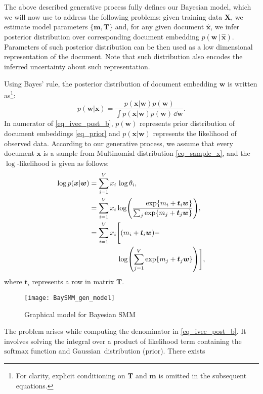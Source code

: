 \documentclass[journal]{IEEEtran}
\newcommand{\mb}[1]{\bm{#1}}
\newcommand{\Gau}{\(\mathrm{Gaussian}\)}
\newcommand{\myfrac}[2]{\setbox0\hbox{$#1$}        \dimen0=\wd0               \setbox1\hbox{$#2$}        \dimen1=\wd1               \ifdim\wd0<\wd1            \dfrac{\hfill#1}{#2}     \else
	\dfrac{#1}{\hfill#2}     \fi
}
\begin{document}
The above described generative process fully defines our Bayesian model,
which we will now use to address the following problems: given training data
\(\mb{X}\), we estimate model parameters \(\{\mb{m}, \mb{T}\}\) and,
for any given document \(\widehat{\mb{x}}\), we infer posterior distribution over
corresponding document embedding \(p(\mb{w}\,|\, \widehat{\mb{x}})\).
Parameters of such posterior distribution can be then used as a low dimensional
representation of the document. Note that such distribution also encodes the
inferred uncertainty about such representation.

Using Bayes' rule, the posterior distribution of document embedding \(\mb{w}\) 
is written as\footnote{For clarity, explicit conditioning on \(\mb{T}\) and 
\(\mb{m}\) is omitted in the subsequent equations.}: \begin{equation}
\label{eq_ivec_post_b}
p(\mb{w} | \mb{x}) = \frac{p(\mb{x} | \mb{w})p(\mb{w})}{\int p(\mb{x} | \mb{w})p(\mb{w}) \, \dd \mb{w}}.
\end{equation}
In numerator of \eqref{eq_ivec_post_b}, \(p(\mb{w})\) represents prior 
distribution of document embeddings \eqref{eq_prior} 
and \(p(\mb{x} | \mb{w})\) represents the likelihood of observed data. 
According to our generative process, we assume that every document \(\mb{x}\) 
is a sample from \(\mathrm{Multinomial}\) distribution \eqref{eq_sample_x}, 
and the \(\log\)-likelihood is given as follows:
\begin{align}
\log p(\mb{x} | \mb{w}) &= \sum_{i=1}^{V} x_{i} \, \log \theta_{i}, \\
&= \sum_{i=1}^{V} x_{i} \log(\myfrac{\exp{m_i + \mb{t}_i \mb{w}}}{\sum_j \exp{m_j + \mb{t}_j \mb{w}}}), \\
&= \sum_{i=1}^{V} x_{i} \Bigg[ (m_i + \mb{t}_i \mb{w}) - \nonumber \\
&{} \qquad \qquad \log({\sum_{j=1}^{V} \exp{m_j + \mb{t}_j \mb{w}}}) \Bigg],  \label{eq_llh}
\end{align}
where \(\mb{t}_i\) represents a row in matrix \(\mb{T}\).
\begin{figure}[t!]
  \centering
  \captionsetup{justification=centering}
	\texttt{[image: BaySMM\_gen\_model]}
  \caption{\label{fig:baysmm} Graphical model for Bayesian SMM}
\end{figure}
The problem arises while computing the denominator in \eqref{eq_ivec_post_b}. 
It involves solving the integral over a product of likelihood term containing 
the \(\mathrm{softmax}\) function and \Gau~distribution (prior). There exists 
\end{document}
